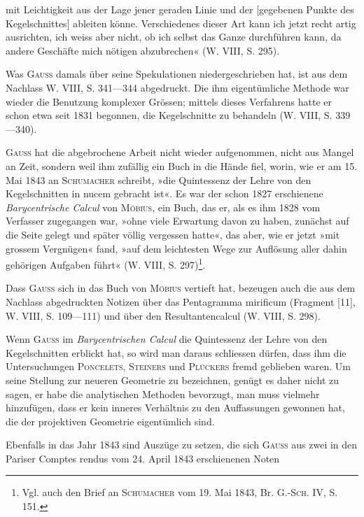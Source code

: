 mit Leichtigkeit aus der Lage jener geraden Linie und der [gegebenen Punkte
des Kegelschnittes] ableiten könne. Verschiedenes dieser Art kann ich jetzt
recht artig ausrichten, ich weiss aber nicht, ob ich selbst das Ganze durchführen
kann, da andere Geschäfte mich nötigen abzubrechen« (W. VIII, S. 295).
\par
Was \textsc{Gauss} damals über seine Spekulationen niedergeschrieben hat, ist
aus dem Nachlass W. VIII, S. 341—344 abgedruckt. Die ihm eigentümliche
Methode war wieder die Benutzung komplexer Grössen; mittels dieses Verfahrens
hatte er schon etwa seit 1831 begonnen, die Kegelschnitte zu behandeln
(W. VIII, S. 339—340).
\par
\textsc{Gauss} hat die abgebrochene Arbeit nicht wieder aufgenommen, nicht aus
Mangel an Zeit, sondern weil ihm zufällig ein Buch in die Hände fiel, worin,
wie er am 15. Mai 1843 an \textsc{Schumacher} schreibt, »die Quintessenz der Lehre
von den Kegelschnitten in nucem gebracht ist«. Es war der schon 1827 erschienene
\textit{Barycentrische Calcul} von \textsc{Möbius}, ein Buch, das er, als es ihm 1828
vom Verfasser zugegangen war, »ohne viele Erwartung davon zu haben, zunächst
auf die Seite gelegt und später völlig vergessen hatte«, das aber, wie er jetzt
»mit grossem Vergnügen« fand, »auf dem leichtesten Wege zur Auflösung aller
dahin gehörigen Aufgaben führt« (W. VIII, S. 297)\footnote{Vgl. auch den Brief an \textsc{Schumacher} vom 19. Mai 1843, Br. G.-\textsc{Sch.} IV, S. 151.}.
\par
Dass \textsc{Gauss} sich in das Buch von \textsc{Möbius} vertieft hat, bezeugen auch die
aus dem Nachlass abgedruckten Notizen über das Pentagramma mirificum
(Fragment [11], W. VIII, S. 109—111) und über den Resultantencalcul (W.
VIII, S. 298).
\par
Wenn \textsc{Gauss} im \textit{Barycentrischen Calcul} die Quintessenz der Lehre von
den Kegelschnitten erblickt hat, so wird man daraus schliessen dürfen, dass
ihm die Untersuchungen \textsc{Poncelets}, \textsc{Steiners} und \textsc{Plückers} fremd geblieben
waren. Um seine Stellung zur neueren Geometrie zu bezeichnen, genügt es
daher nicht zu sagen, er habe die analytischen Methoden bevorzugt, man muss
vielmehr hinzufügen, dass er kein inneres Verhältnis zu den Auffassungen
gewonnen hat, die der projektiven Geometrie eigentümlich sind.
\par
Ebenfalls in das Jahr 1843 sind Auszüge zu setzen, die sich \textsc{Gauss} aus
zwei in den Pariser Comptes rendus vom 24. April 1843 erschienenen Noten
\clearpage{}\setcounter{footnote}{0}
